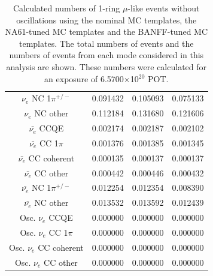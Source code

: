\begin{table}
\begin{tabular}{| c |  D{.}{.}{-1} |  D{.}{.}{-1} |  D{.}{.}{-1} | }
$\nu_e$ NC 1$\pi^{+/-}$ & 0.091432 & 0.105093 & 0.075133 \\ 
$\nu_e$ NC other & 0.112184 & 0.131680 & 0.121606 \\ 
$\bar{\nu_e}$ CCQE & 0.002174 & 0.002187 & 0.002102 \\ 
$\bar{\nu_e}$ CC 1$\pi$ & 0.001376 & 0.001385 & 0.001345 \\ 
$\bar{\nu_e}$ CC coherent & 0.000135 & 0.000137 & 0.000137 \\ 
$\bar{\nu_e}$ CC other & 0.000442 & 0.000446 & 0.000432 \\ 
$\bar{\nu_e}$ NC 1$\pi^{+/-}$ & 0.012254 & 0.012354 & 0.008390 \\ 
$\bar{\nu_e}$ NC other & 0.013532 & 0.013592 & 0.012439 \\ 
Osc. $\nu_e$ CCQE & 0.000000 & 0.000000 & 0.000000 \\ 
Osc. $\nu_e$ CC 1$\pi$ & 0.000000 & 0.000000 & 0.000000 \\ 
Osc. $\nu_e$ CC coherent & 0.000000 & 0.000000 & 0.000000 \\ 
Osc. $\nu_e$ CC other & 0.000000 & 0.000000 & 0.000000 \\ 
\hline
\end{tabular}
\caption{
  Calculated numbers of 1-ring $\mu$-like events without oscillations using the nominal MC templates, the
  NA61-tuned MC templates and the BANFF-tuned MC templates.
  The total numbers of events and the numbers of events from each mode considered in this analysis are shown.
  These numbers were calculated for an exposure of 6.5700$\times$10$^{20}$ POT.
}
\label{tab:nsk_nominal_x3_no_osc}
\end{table}
